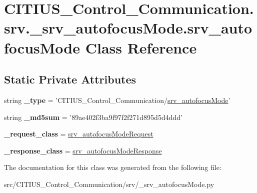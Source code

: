 \hypertarget{class_c_i_t_i_u_s___control___communication_1_1srv_1_1__srv__autofocus_mode_1_1srv__autofocus_mode}{\section{\-C\-I\-T\-I\-U\-S\-\_\-\-Control\-\_\-\-Communication.\-srv.\-\_\-srv\-\_\-autofocus\-Mode.\-srv\-\_\-autofocus\-Mode \-Class \-Reference}
\label{class_c_i_t_i_u_s___control___communication_1_1srv_1_1__srv__autofocus_mode_1_1srv__autofocus_mode}
}
\subsection*{\-Static \-Private \-Attributes}
\begin{DoxyCompactItemize}
\item 
\hypertarget{class_c_i_t_i_u_s___control___communication_1_1srv_1_1__srv__autofocus_mode_1_1srv__autofocus_mode_a55a4556d3f4b3f71e333613862e7b1fb}{string {\bfseries \-\_\-type} = '\-C\-I\-T\-I\-U\-S\-\_\-\-Control\-\_\-\-Communication/\hyperlink{class_c_i_t_i_u_s___control___communication_1_1srv_1_1__srv__autofocus_mode_1_1srv__autofocus_mode}{srv\-\_\-autofocus\-Mode}'}\label{class_c_i_t_i_u_s___control___communication_1_1srv_1_1__srv__autofocus_mode_1_1srv__autofocus_mode_a55a4556d3f4b3f71e333613862e7b1fb}

\item 
\hypertarget{class_c_i_t_i_u_s___control___communication_1_1srv_1_1__srv__autofocus_mode_1_1srv__autofocus_mode_a1f1c9a64c20fc74a9cedfb9dd0e3c5aa}{string {\bfseries \-\_\-md5sum} = '89ae402f3ba9f97f2f271d895d5d4ddd'}\label{class_c_i_t_i_u_s___control___communication_1_1srv_1_1__srv__autofocus_mode_1_1srv__autofocus_mode_a1f1c9a64c20fc74a9cedfb9dd0e3c5aa}

\item 
\hypertarget{class_c_i_t_i_u_s___control___communication_1_1srv_1_1__srv__autofocus_mode_1_1srv__autofocus_mode_aff1f8cfff14042b56a2fc9aac034e549}{{\bfseries \-\_\-request\-\_\-class} = \hyperlink{class_c_i_t_i_u_s___control___communication_1_1srv_1_1__srv__autofocus_mode_1_1srv__autofocus_mode_request}{srv\-\_\-autofocus\-Mode\-Request}}\label{class_c_i_t_i_u_s___control___communication_1_1srv_1_1__srv__autofocus_mode_1_1srv__autofocus_mode_aff1f8cfff14042b56a2fc9aac034e549}

\item 
\hypertarget{class_c_i_t_i_u_s___control___communication_1_1srv_1_1__srv__autofocus_mode_1_1srv__autofocus_mode_aedc98c26065fe40eb110ab35263f6b8d}{{\bfseries \-\_\-response\-\_\-class} = \hyperlink{class_c_i_t_i_u_s___control___communication_1_1srv_1_1__srv__autofocus_mode_1_1srv__autofocus_mode_response}{srv\-\_\-autofocus\-Mode\-Response}}\label{class_c_i_t_i_u_s___control___communication_1_1srv_1_1__srv__autofocus_mode_1_1srv__autofocus_mode_aedc98c26065fe40eb110ab35263f6b8d}

\end{DoxyCompactItemize}


\-The documentation for this class was generated from the following file\-:\begin{DoxyCompactItemize}
\item 
src/\-C\-I\-T\-I\-U\-S\-\_\-\-Control\-\_\-\-Communication/srv/\-\_\-srv\-\_\-autofocus\-Mode.\-py\end{DoxyCompactItemize}

